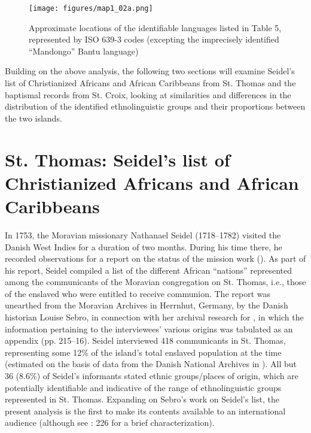 \documentclass[output=paper,colorlinks,citecolor=brown]{langscibook}
\begin{document}
\begin{figure}
    \centering
    \texttt{[image: figures/map1\_02a.png]}
    \caption{Approximate locations of the identifiable languages listed in Table 5, represented by ISO 639-3 codes (excepting the imprecisely identified ``Mandongo'' Bantu language)}
    \label{fig:map1_02}
\end{figure}

Building on the above analysis, the following two sections will examine Seidel's list of Christianized Africans and African Caribbeans from St. Thomas and the baptismal records from St. Croix, looking at similarities and differences in the distribution of the identified ethnolinguistic groups and their proportions between the two islands.


\section{St. Thomas: Seidel’s list of Christianized Africans and African Caribbeans}

In 1753, the Moravian missionary Nathanael Seidel (1718–1782) visited the Danish West Indies for a duration of two months. During his time there, he recorded observations for a report on the status of the mission work (\cite{Seidel_1753}). As part of his report, Seidel compiled a list of the different African ``nations'' represented among the communicants of the Moravian congregation on St. Thomas, i.e., those of the enslaved who were entitled to receive communion. The report was unearthed from the Moravian Archives in Herrnhut, Germany, by the Danish historian Louise Sebro, in connection with her archival research for \citet{Sebro_2010}, in which the information pertaining to the interviewees’ various origins was tabulated as an appendix (pp. 215–16). Seidel interviewed 418 communicants in St. Thomas, representing some 12\% of the island’s total enslaved population at the time (estimated on the basis of data from the Danish National Archives in \citealp[157]{GreenPedersen_1971}). All but 36 (8.6\%) of Seidel's informants stated ethnic groups/places of origin, which are potentially identifiable and indicative of the range of ethnolinguistic groups represented in St. Thomas. Expanding on Sebro's work on Seidel's list, the present analysis is the first to make its contents available to an international audience (although see \cite{Bakker_2016b}: 226 for a brief characterization).
\end{document}
